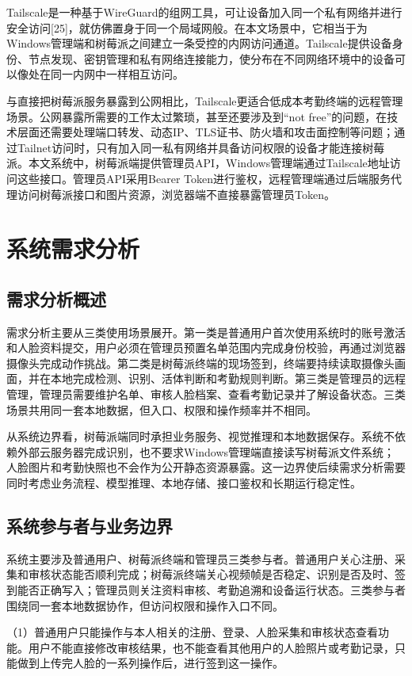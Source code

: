 \documentclass[UTF8]{heuthesis}
\begin{document}
Tailscale是一种基于WireGuard的组网工具，可让设备加入同一个私有网络并进行安全访问[25]，就仿佛置身于同一个局域网般。在本文场景中，它相当于为Windows管理端和树莓派之间建立一条受控的内网访问通道。Tailscale提供设备身份、节点发现、密钥管理和私有网络连接能力，使分布在不同网络环境中的设备可以像处在同一内网中一样相互访问。

与直接把树莓派服务暴露到公网相比，Tailscale更适合低成本考勤终端的远程管理场景。公网暴露所需要的工作太过繁琐，甚至还要涉及到“not free”的问题，在技术层面还需要处理端口转发、动态IP、TLS证书、防火墙和攻击面控制等问题；通过Tailnet访问时，只有加入同一私有网络并具备访问权限的设备才能连接树莓派。本文系统中，树莓派端提供管理员API，Windows管理端通过Tailscale地址访问这些接口。管理员API采用Bearer Token进行鉴权，远程管理端通过后端服务代理访问树莓派接口和图片资源，浏览器端不直接暴露管理员Token。

\chapter{系统需求分析}
\section{需求分析概述}
需求分析主要从三类使用场景展开。第一类是普通用户首次使用系统时的账号激活和人脸资料提交，用户必须在管理员预置名单范围内完成身份校验，再通过浏览器摄像头完成动作挑战。第二类是树莓派终端的现场签到，终端要持续读取摄像头画面，并在本地完成检测、识别、活体判断和考勤规则判断。第三类是管理员的远程管理，管理员需要维护名单、审核人脸档案、查看考勤记录并了解设备状态。三类场景共用同一套本地数据，但入口、权限和操作频率并不相同。

从系统边界看，树莓派端同时承担业务服务、视觉推理和本地数据保存。系统不依赖外部云服务器完成识别，也不要求Windows管理端直接读写树莓派文件系统；人脸图片和考勤快照也不会作为公开静态资源暴露。这一边界使后续需求分析需要同时考虑业务流程、模型推理、本地存储、接口鉴权和长期运行稳定性。

\section{系统参与者与业务边界}
系统主要涉及普通用户、树莓派终端和管理员三类参与者。普通用户关心注册、采集和审核状态能否顺利完成；树莓派终端关心视频帧是否稳定、识别是否及时、签到能否正确写入；管理员则关注资料审核、考勤追溯和设备运行状态。三类参与者围绕同一套本地数据协作，但访问权限和操作入口不同。

（1）普通用户只能操作与本人相关的注册、登录、人脸采集和审核状态查看功能。用户不能直接修改审核结果，也不能查看其他用户的人脸照片或考勤记录，只能做到上传完人脸的一系列操作后，进行签到这一操作。
\end{document}
